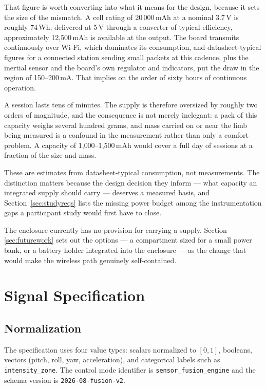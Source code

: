 \documentclass[11pt,a4paper]{article}
\newcommand{\code}[1]{\texttt{\small #1}}
\begin{document}
That figure is worth converting into what it means for the design, because it
sets the size of the mismatch. A cell rating of 20\,000\,mAh at a nominal
3.7\,V is roughly 74\,Wh; delivered at 5\,V through a converter of typical
efficiency, approximately 12{,}500\,mAh is available at the output. The board
transmits continuously over Wi-Fi, which dominates its consumption, and
datasheet-typical figures for a connected station sending small packets at this
cadence, plus the inertial sensor and the board's own regulator and indicators,
put the draw in the region of 150--200\,mA. That implies on the order of
sixty hours of continuous operation.

A session lasts tens of minutes. The supply is therefore oversized by roughly
two orders of magnitude, and the consequence is not merely inelegant: a pack of
this capacity weighs several hundred grams, and mass carried on or near the
limb being measured is a confound in the measurement rather than only a comfort
problem. A capacity of 1{,}000--1{,}500\,mAh would cover a full day of sessions
at a fraction of the size and mass.

These are estimates from datasheet-typical consumption, not measurements. The
distinction matters because the design decision they inform --- what capacity
an integrated supply should carry --- deserves a measured basis, and
Section~\ref{sec:studyreqs} lists the missing power budget among the
instrumentation gaps a participant study would first have to close.

The enclosure currently has no provision for carrying a supply. Section
\ref{sec:futurework} sets out the options --- a compartment sized for a small
power bank, or a battery holder integrated into the enclosure --- as the change
that would make the wireless path genuinely self-contained.

\section{Signal Specification}
\label{sec:contract}

\subsection{Normalization}

The specification uses four value types: scalars normalized to $[0,1]$, booleans,
vectors (pitch, roll, yaw, acceleration), and categorical labels such as
\code{intensity\_zone}. The control mode identifier is
\code{sensor\_fusion\_engine} and the schema version is
\code{2026-08-fusion-v2}.
\end{document}
